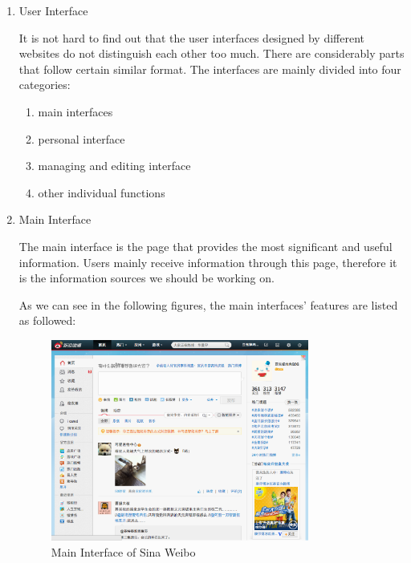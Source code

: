 \begin{enumerate}
  \item User Interface

It is not hard to find out that the user interfaces
designed by different websites do not distinguish each other too much.
There are considerably parts that follow certain similar format.
The interfaces are mainly divided into four categories:
\begin{enumerate}
  \item main interfaces
  \item personal interface
  \item managing and editing interface
  \item other individual functions
\end{enumerate}

\item Main Interface

    The main interface is the page that provides the most significant
    and useful information.
    Users mainly receive information through this page, therefore it is the
    information sources we should be working on.

    As we can see in the following figures, the main interfaces’ features are listed as followed:

\begin{figure}[H]
  \centering
  \includegraphics[width=0.8\textwidth]{img/weibo.png}
  \caption{Main Interface of Sina Weibo\label{fig:weibo}}
\end{figure}


\end{enumerate}
